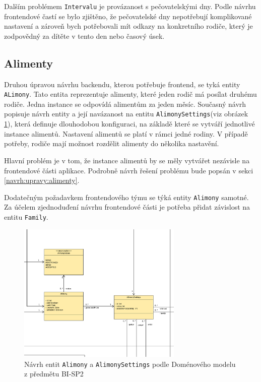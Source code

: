        Dalším problémem \texttt{Intervalu} je provázanost s pečovatelskými dny. Podle návrhu frontendové častí se bylo zjištěno, že pečovatelské dny nepotřebují komplikované nastavení a zároveň bych potřebovali mít odkazy na konkretního rodiče, který je zodpovědný za dítěte v tento den nebo časový úsek.
    
    \subsection{Alimenty}
        Druhou úpravou návrhu backendu, kterou potřebuje frontend, se tyká entity \texttt{ALimony}.
        Tato entita reprezentuje alimenty, které jeden rodič má posílat druhému rodiče. Jedna instance se odpovídá alimentům za jeden měsíc. Současný návrh popisuje návrh entity a její navázanost na entitu \texttt{AlimonySettings}(viz obrázek \ref{image:aliomny-draft1}), která definuje dlouhodobou konfiguraci, na základě které se vytváří jednotlivé instance alimentů. Nastavení alimentů se platí v rámci jedné rodiny. V případě potřeby, rodiče mají možnost rozdělit alimenty do několika nastavění. 
        
        Hlavní problém je v tom, že instance alimentů by se měly vytvářet nezávisle na frontendové části aplikace. Podrobně návrh řešení problému bude popsán v sekci \ref{navrh:upravy:alimenty}.
        
        Dodatečným požadavkem frontendového týmu se týká entity \texttt{Alimony} samotné. Za účelem zjednoduďení návrhu frontendové části je potřeba přidat závislost na entitu \texttt{Family}. %
        \begin{figure}\centering
	        \includegraphics[width=0.7\textwidth]{pdfs/AlimonyDraft1}
	        \caption[Návrh \texttt{Alimony} a \texttt{AlimonySettings}]{Návrh entit \texttt{Alimony} a \texttt{AlimonySettings} podle Doménového modelu z předmětu BI-SP2}\label{image:aliomny-draft1}
        \end{figure}
        
